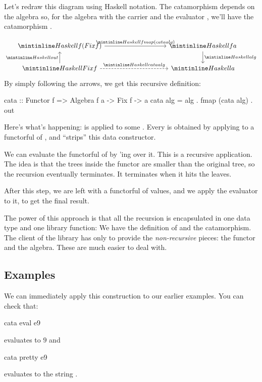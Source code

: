 \documentclass[DaoFP]{subfiles}
\begin{document}
Let's redraw this diagram using Haskell notation. The catamorphism depends on the algebra so, for the algebra with the carrier  and the evaluator , we'll have the catamorphism .

\[
 \begin{tikzcd}
  \hask{f (Fix f)}
 \arrow[rrrr, "\hask{fmap (cata alg)}"]
 &&&& \hask{f a}
\arrow[d, "\hask{alg}"]
 \\
 \hask{Fix f}
 \arrow[u, "\hask{out}"]
 \arrow[rrrr, dashed, "\hask{cata alg}"]
 &&&& \hask{a}
  \end{tikzcd}
\]
By simply following the arrows, we get this recursive definition:
\begin{haskell}
cata :: Functor f => Algebra f a -> Fix f -> a
cata alg = alg . fmap (cata alg) . out
\end{haskell}

Here's what's happening:  is applied to some . Every  is obtained by applying  to a functorful of , and  ``strips'' this data constructor. 

We can evaluate the functorful of  by 'ing  over it. This is a recursive application. The idea is that the trees inside the functor are smaller than the original tree, so the recursion eventually terminates. It terminates when it hits the leaves. 

After this step, we are left with a functorful of values, and we apply the evaluator  to it, to get the final result.

The power of this approach is that all the recursion is encapsulated in one data type and one library function: We have the definition of  and the catamorphism. The client of the library has only to provide the \emph{non-recursive} pieces: the functor and the algebra. These are much easier to deal with.

\subsection{Examples}

We can immediately apply this construction to our earlier examples. You can check that:
\begin{haskell}
cata eval e9
\end{haskell}
evaluates to $9$ and
\begin{haskell}
cata pretty e9
\end{haskell}
evaluates to the string .
\end{document}

